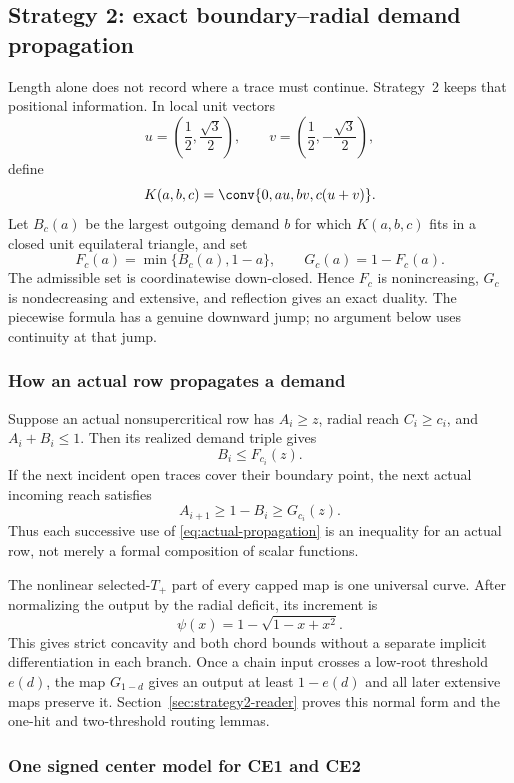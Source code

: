 \subsection{Strategy 2: exact boundary--radial demand propagation}
\label{subsec:exact-demand-guide}

Length alone does not record where a trace must continue. Strategy~2 keeps
that positional information. In local unit vectors
\[
 u=\left(\frac12,\frac{\sqrt3}{2}\right),\qquad
 v=\left(\frac12,-\frac{\sqrt3}{2}\right),
\]
define
\[
 K(a,b,c)=\conv\{0,au,bv,c(u+v)\}.
\]
Let $B_c(a)$ be the largest outgoing demand $b$ for which $K(a,b,c)$ fits
in a closed unit equilateral triangle, and set
\[
 F_c(a)=\min\{B_c(a),1-a\},\qquad G_c(a)=1-F_c(a).
\]
The admissible set is coordinatewise down-closed. Hence $F_c$ is
nonincreasing, $G_c$ is nondecreasing and extensive, and reflection gives
an exact duality. The piecewise formula has a genuine downward jump; no
argument below uses continuity at that jump.

\subsubsection{How an actual row propagates a demand}

Suppose an actual nonsupercritical row has $A_i\ge z$, radial reach
$C_i\ge c_i$, and $A_i+B_i\le1$. Then its realized demand triple gives
\[
 B_i\le F_{c_i}(z).
\]
If the next incident open traces cover their boundary point, the next actual
incoming reach satisfies
\begin{equation}
 A_{i+1}\ge1-B_i\ge G_{c_i}(z).
 \label{eq:actual-propagation}
\end{equation}
Thus each successive use of \eqref{eq:actual-propagation} is an inequality
for an actual row, not merely a formal composition of scalar functions.

The nonlinear selected-$T_+$ part of every capped map is one universal curve.
After normalizing the output by the radial deficit, its increment is
\[
 \psi(x)=1-\sqrt{1-x+x^2}.
\]
This gives strict concavity and both chord bounds without a separate implicit
differentiation in each branch. Once a chain input crosses a low-root
threshold $e(d)$, the map $G_{1-d}$ gives an output at least $1-e(d)$ and all
later extensive maps preserve it. Section~\ref{sec:strategy2-reader} proves
this normal form and the one-hit and two-threshold routing lemmas.

\subsubsection{One signed center model for CE1 and CE2}

